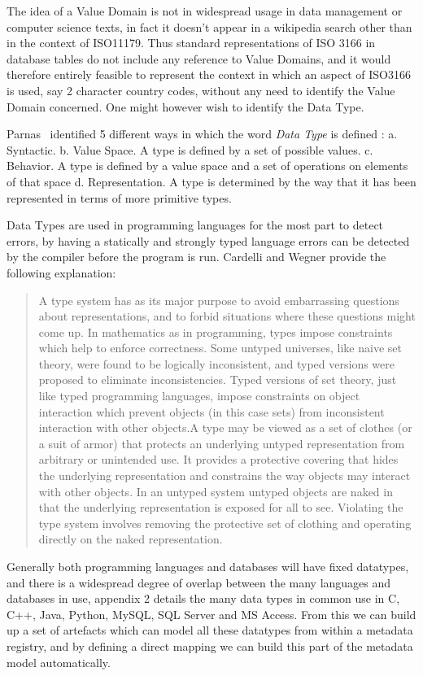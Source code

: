 \documentclass{article}
\begin{document}
The idea of a Value Domain is not in widespread usage in data management or computer science texts, in fact it doesn't appear in a wikipedia search other than in the context of ISO11179. Thus standard representations of ISO 3166 in database tables do not include any reference to Value Domains, and it would therefore entirely feasible to represent the context in which an aspect of ISO3166 is used, say 2 character country codes, without any need to identify the Value Domain concerned. One might however wish to identify the Data Type.

Parnas~\cite{Parnas1976}  identified 5 different ways in which the word \emph{Data Type} is defined : a. Syntactic. b. Value Space. A type is defined by a set of possible values. c. Behavior. A type is defined by a value space and a set of operations on elements of that space d. Representation. A type is determined by the way that it has been represented in terms of more primitive types. 

Data Types are used in programming languages for the most part to detect errors, by having a statically and strongly typed language errors can be detected by the compiler before the program is run. Cardelli and Wegner \cite{Cardelli1985} provide the following explanation:
\begin{quotation}
A type system has as its major purpose to avoid embarrassing questions about representations, and to forbid situations where these questions might come up. In mathematics as in programming, types impose constraints which help to enforce correctness. Some untyped universes, like naive set theory, were found to be logically inconsistent, and typed versions were proposed to eliminate inconsistencies. Typed versions of set theory, just like typed programming languages, impose constraints on object interaction which prevent objects (in this case sets) from inconsistent interaction with other objects.A  type  may  be  viewed  as  a  set  of  clothes  (or  a  suit  of  armor)  that  protects  an  underlying  untyped representation from arbitrary or unintended use. It provides a protective covering that hides the underlying representation and constrains the way objects may interact with other objects. In an untyped system untyped objects are naked in that the underlying representation is exposed for all to see. Violating the type system involves removing the protective set of clothing and operating directly on the naked representation.
\end{quotation}  

Generally both programming languages and databases will have fixed datatypes, and there is a widespread degree of overlap between the many languages and databases in use, appendix 2 details the many data types in common use in C, C++, Java, Python, MySQL, SQL Server and MS Access. From this we can build up a set of artefacts which can model all these datatypes from within a metadata registry, and by defining a direct mapping we can build this part of the metadata model automatically.
\end{document}
